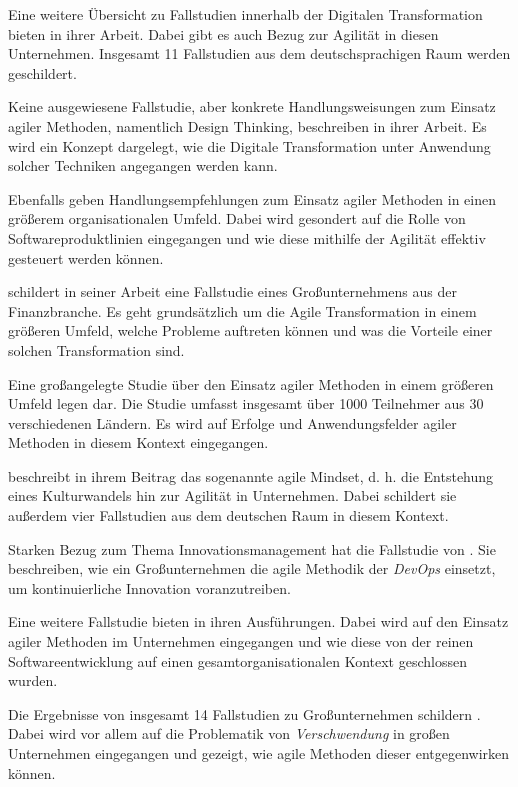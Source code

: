 Eine weitere Übersicht zu Fallstudien innerhalb der Digitalen Transformation bieten  in ihrer Arbeit. Dabei gibt es auch Bezug zur Agilität in diesen Unternehmen. Insgesamt 11 Fallstudien aus dem deutschsprachigen Raum werden geschildert.

Keine ausgewiesene Fallstudie, aber konkrete Handlungsweisungen zum Einsatz agiler Methoden, namentlich Design Thinking, beschreiben  in ihrer Arbeit. Es wird ein Konzept dargelegt, wie die Digitale Transformation unter Anwendung solcher Techniken angegangen werden kann.

Ebenfalls geben  Handlungsempfehlungen zum Einsatz agiler Methoden in einen größerem organisationalen Umfeld. Dabei wird gesondert auf die Rolle von Softwareproduktlinien eingegangen und wie diese mithilfe der Agilität effektiv gesteuert werden können.

 schildert in seiner Arbeit eine Fallstudie eines Großunternehmens aus der Finanzbranche. Es geht grundsätzlich um die Agile Transformation in einem größeren Umfeld, welche Probleme auftreten können und was die Vorteile einer solchen Transformation sind.

Eine großangelegte Studie über den Einsatz agiler Methoden in einem größeren Umfeld legen  dar. Die Studie umfasst insgesamt über 1000 Teilnehmer aus 30 verschiedenen Ländern. Es wird auf Erfolge und Anwendungsfelder agiler Methoden in diesem Kontext eingegangen.

 beschreibt in ihrem Beitrag das sogenannte agile Mindset, d. h. die Entstehung eines Kulturwandels hin zur Agilität in Unternehmen. Dabei schildert sie außerdem vier Fallstudien aus dem deutschen Raum in diesem Kontext. 

Starken Bezug zum Thema Innovationsmanagement hat die Fallstudie von . Sie beschreiben, wie ein Großunternehmen die agile Methodik der \textit{DevOps} einsetzt, um kontinuierliche Innovation voranzutreiben.

Eine weitere Fallstudie bieten  in ihren Ausführungen. Dabei wird auf den Einsatz agiler Methoden im Unternehmen eingegangen und wie diese von der reinen Softwareentwicklung auf einen gesamtorganisationalen Kontext geschlossen wurden.

Die Ergebnisse von insgesamt 14 Fallstudien zu Großunternehmen schildern . Dabei wird vor allem auf die Problematik von \textit{Verschwendung} in großen Unternehmen eingegangen und gezeigt, wie agile Methoden dieser entgegenwirken können.

